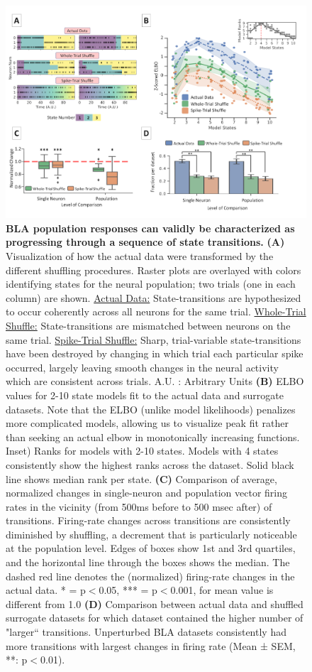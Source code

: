 \begin{refsection}
\begin{figure}
\includegraphics[width=\linewidth]{mahmood_22_figures/fig4-0.png}
\caption{\textbf{BLA population responses can validly be characterized as progressing through a sequence of state transitions.} \textbf{(A)} Visualization of how the actual data were transformed by the different shuffling procedures. Raster plots are overlayed with colors identifying states for the neural population; two trials (one in each column) are shown. \underline{Actual Data:} State-transitions are hypothesized to occur coherently across all neurons for the same trial. \underline{Whole-Trial Shuffle:} State-transitions are mismatched between neurons on the same trial. \underline{Spike-Trial Shuffle:} Sharp, trial-variable state-transitions have been destroyed by changing in which trial each particular spike occurred, largely leaving smooth changes in the neural activity which are consistent across trials. A.U. : Arbitrary Units  \textbf{(B)} ELBO values for 2-10 state models fit to the actual data and surrogate datasets. Note that the ELBO (unlike model likelihoods) penalizes more complicated models, allowing us to visualize peak fit rather than seeking an actual elbow in monotonically increasing functions. Inset) Ranks for models with 2-10 states. Models with 4 states consistently show the highest ranks across the dataset. Solid black line shows median rank per state. \textbf{(C)} Comparison of average, normalized changes in single-neuron and population vector firing rates in the vicinity (from 500ms before to 500 msec after) of transitions. Firing-rate changes across transitions are consistently diminished by shuffling, a decrement that is particularly noticeable at the population level. Edges of boxes show 1st and 3rd quartiles, and the horizontal line through the boxes shows the median. The dashed red line denotes the (normalized) firing-rate changes in the actual data. * = p\(<\)0.05, *** = p\(<\)0.001, for mean value is different from 1.0 \textbf{(D)} Comparison between actual data and shuffled surrogate datasets for which dataset contained the higher number of "larger“ transitions. Unperturbed BLA datasets consistently had more transitions with largest changes in firing rate (Mean ± SEM, **: p\(<\)0.01).}
\label{fig:wrapfig}
\end{figure}


\end{refsection}
